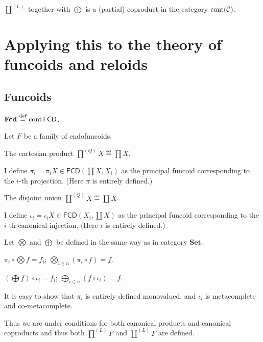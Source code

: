 \begin{thm}
  $\coprod^{(L)}$ together with $\bigoplus$ is a (partial) coproduct in the
  category $\operatorname{cont} (\mathcal{C})$.
\end{thm}

\section{Applying this to the theory of funcoids and reloids}

\subsection{Funcoids}

\begin{defn}
  $\mathbf{Fcd} \overset{\mathrm{def}}{=} \operatorname{cont} \mathsf{FCD}$.
\end{defn}

Let $F$ be a family of endofuncoids.

The cartesian product $\prod^{(Q)} X \eqdef \prod X$.

I define $\pi_i = \pi_i X \in \mathsf{FCD} \left( \prod X , X_i
\right)$ as the principal funcoid corresponding to the $i$-th projection.
(Here $\pi$ is entirely defined.)

The disjoint union $\coprod^{(Q)} X \eqdef \coprod X$.

I define $\iota_i = \iota_i X \in \mathsf{FCD} \left( X_i , \coprod X
\right)$ as the principal funcoid corresponding to the $i$-th canonical
injection. (Here $\iota$ is entirely defined.)

Let $\bigotimes$ and $\bigoplus$ be defined in the same way as in category
$\mathbf{Set}$. 

\begin{obvious}
$\pi_i \circ \bigotimes f = f_i$; $\bigotimes_{i \in n} (\pi_i \circ f) =
f$.
\end{obvious}

\begin{obvious}
$\left( \bigoplus f \right) \circ \iota_i = f_i$; $\bigoplus_{i \in n} (f
\circ \iota_i) = f$.
\end{obvious}

It is easy to show that $\pi_i$ is entirely defined monovalued, and $\iota_i$
is metacomplete and co-metacomplete.

Thus we are under conditions for both canonical products and canonical
coproducts and thus both $\prod^{(L)} F$ and $\coprod^{(L)} F$ are defined.

